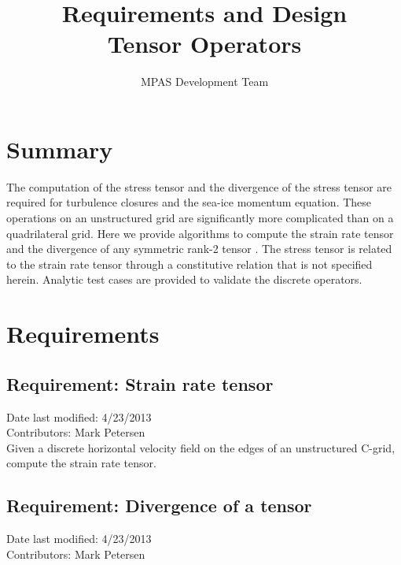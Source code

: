 \documentclass[11pt]{report}
\begin{document}
\title{
Requirements and Design\\
Tensor Operators}
\author{MPAS Development Team}

\maketitle
\tableofcontents


\chapter{Summary}

The computation of the stress tensor and the divergence of the stress tensor are required for turbulence closures and the sea-ice momentum equation.  These operations on an unstructured grid are significantly more complicated than on a quadrilateral grid.  Here we provide algorithms to compute the strain rate tensor and the divergence of any symmetric rank-2 tensor . The stress tensor is related to the strain rate tensor through a constitutive relation that is not specified herein.  Analytic test cases are provided to validate the discrete operators.




\chapter{Requirements}

\section{Requirement: Strain rate tensor}
Date last modified: 4/23/2013 \\
Contributors: Mark Petersen \\

 Given a discrete horizontal velocity field on the edges of an unstructured C-grid, compute the strain rate tensor.

\section{Requirement: Divergence of a tensor}
Date last modified: 4/23/2013 \\
Contributors: Mark Petersen \\
\end{document}
